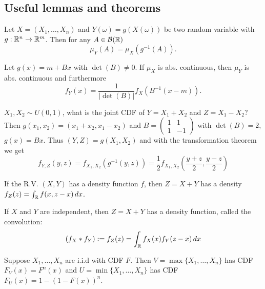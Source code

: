 \pagebreak
\subsection{Useful lemmas and theorems}

\begin{definition*}
  Let \(X = (X_1, \ldots, X_n)\) and \(Y(\omega) = g(X(\omega))\) be two random variable with \(g: \mathbb{R}^n \to \mathbb{R}^m\). Then for any \(A \in \mathcal{B}(\mathbb{R})\)
  \vspace{-10pt}
  \[\mu_Y(A) = \mu_X(g^{-1}(A)).\]
\end{definition*}

\begin{theorem*}
  Let \(g(x) = m + Bx\) with \(\det(B) \neq 0\). If \(\mu_X\) is abs. continuous, then \(\mu_Y\) is abs. continuous and furthermore
  \[f_Y(x) = \frac{1}{|\det(B)|} f_X(B^{-1}(x - m)).\]
\end{theorem*}

\begin{example}
  \(X_1, X_2 \sim U(0, 1)\), what is the joint CDF of \(Y = X_1 + X_2\) and \(Z = X_1 - X_2\)? \\
  Then \(g(x_1, x_2) = (x_1 + x_2, x_1 - x_2)\) and \(B = \begin{pmatrix}
    1 & 1 \\
    1 & -1
  \end{pmatrix}\) with \(\det (B) = 2\), \(g(x) = Bx\). Thus \((Y, Z) = g(X_1, X_2)\) and with the transformation theorem we get
  \[f_{Y, Z}(y, z) = f_{X_1, X_2}(g^{-1}(y, z)) = \frac{1}{2}f_{X_1, X_2}\left(\frac{y+z}{2}, \frac{y-z}{2}\right)\]
\end{example}

\begin{proposition}
  If the R.V. \((X, Y)\) has a density function \(f\), then \(Z = X + Y\) has a density 
  \(f_Z(z) = \int_{\mathbb{R}} f(x, z - x) \, dx\).
\end{proposition}

\begin{definition*}[Convolution]
  If \(X\) and \(Y\) are independent, then \(Z = X + Y\) has a density function, called the convolution:
  \[(f_X * f_Y) := f_Z(z) = \int_{\mathbb{R}} f_X(x)f_Y(z - x) \, dx\]
\end{definition*}

\begin{proposition}
  Suppose \(X_1, \ldots, X_n\) are i.i.d with CDF \(F\). Then \(V = \max\{X_1, \ldots, X_n\}\) has CDF \(F_V(x) = F^n(x)\) and
  \(U = \min \{X_1, \ldots, X_n\}\) has CDF \(F_U(x) = 1 - (1 - F(x))^n\).
\end{proposition}
